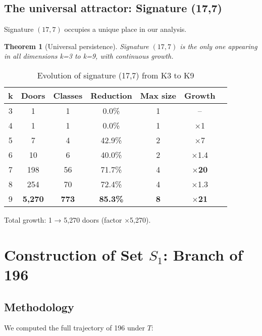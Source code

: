 \documentclass[12pt,a4paper]{article}
\newtheorem{theorem}{Theorem}[section]
\theoremstyle{remark}
\begin{document}
\subsection{The universal attractor: Signature (17,7)}

Signature $(17, 7)$ occupies a unique place in our analysis.

\begin{theorem}[Universal persistence]
Signature $(17, 7)$ is the only one appearing in all dimensions k=3 to k=9, with continuous growth.
\end{theorem}

\begin{table}[h]
\centering
\caption{Evolution of signature (17,7) from K3 to K9}
\label{tab:evo177}
\begin{tabular}{ccccccc}
\toprule
\textbf{k} & \textbf{Doors} & \textbf{Classes} & \textbf{Reduction} & \textbf{Max size} & \textbf{Growth}\\
\midrule
3 & 1 & 1 & 0.0\% & 1 & --\\
4 & 1 & 1 & 0.0\% & 1 & $\times$1\\
5 & 7 & 4 & 42.9\% & 2 & $\times$7\\
6 & 10 & 6 & 40.0\% & 2 & $\times$1.4\\
7 & 198 & 56 & 71.7\% & 4 & \textbf{$\times$20}\\
8 & 254 & 70 & 72.4\% & 4 & $\times$1.3\\
9 & \textbf{5,270} & \textbf{773} & \textbf{85.3\%} & \textbf{8} & \textbf{$\times$21}\\
\bottomrule
\end{tabular}
\end{table}

Total growth: 1 → 5,270 doors (factor ×5,270).


\section{Construction of Set $S_1$: Branch of 196}
\label{sec:ensemble_s1}

\subsection{Methodology}

We computed the full trajectory of 196 under $T$:
\end{document}
